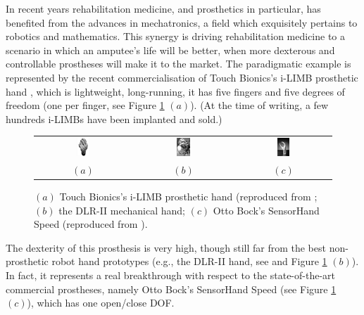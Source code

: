 In recent years rehabilitation medicine, and prosthetics in
particular, has benefited from the advances in mechatronics, a field
which exquisitely pertains to robotics and mathematics. This synergy
is driving rehabilitation medicine to a scenario in which an amputee's
life will be better, when more dexterous and controllable prostheses
will make it to the market. The paradigmatic example is represented by
the recent commercialisation of Touch Bionics's i-LIMB prosthetic hand
\cite{ilimb}, which is lightweight, long-running, it has five fingers
and five degrees of freedom (one per finger, see Figure
\ref{fig:hands} $(a)$). (At the time of writing, a few hundreds i-LIMBs
have been implanted and sold.)

\begin{figure}
  \begin{tabular}{ccc}
    \includegraphics[width=0.14\textwidth]{figs/hands_TB.jpg} &
    \includegraphics[width=0.14\textwidth]{figs/hands_DLRII.jpg} &
    \includegraphics[width=0.14\textwidth]{figs/hands_OB.jpg} \\
    $(a)$ & $(b)$ & $(c)$
  \end{tabular}
  \caption{$(a)$ Touch Bionics's i-LIMB prosthetic hand (reproduced
    from \cite{ilimb}; $(b)$ the DLR-II mechanical hand; $(c)$ Otto
    Bock's SensorHand Speed (reproduced from \cite{sensorhand}).}
  \label{fig:hands}
\end{figure}

The dexterity of this prosthesis is very high, though still far from
the best non-prosthetic robot hand prototypes (e.g., the DLR-II hand,
see \cite{Hua2006} and Figure \ref{fig:hands} $(b)$). In fact, it
represents a real breakthrough with respect to the state-of-the-art
commercial prostheses, namely Otto Bock's SensorHand Speed (see Figure
\ref{fig:hands} $(c)$), which has one open/close DOF.

